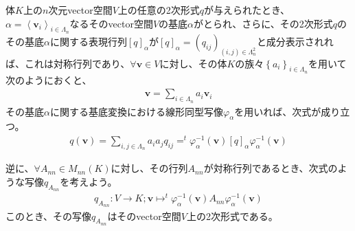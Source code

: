 \documentclass[dvipdfmx]{jsarticle}
\begin{document}
\begin{thm}\label{2.3.5.3}
体$K$上の$n$次元vector空間$V$上の任意の2次形式$q$が与えられたとき、$\alpha = \left\langle \mathbf{v}_{i} \right\rangle_{i \in \varLambda_{n}}$なるそのvector空間$V$の基底$\alpha$がとられ、さらに、その2次形式$q$のその基底$\alpha$に関する表現行列$[ q]_{\alpha}$が$[ q]_{\alpha} = \left( q_{ij} \right)_{(i,j) \in \varLambda_{n}^{2}}$と成分表示されれば、これは対称行列であり、$\forall\mathbf{v} \in V$に対し、その体$K$の族々$\left\{ a_{i} \right\}_{i \in \varLambda_{n}}$を用いて次のようにおくと、
\begin{align*}
\mathbf{v} = \sum_{i \in \varLambda_{n}} {a_{i}\mathbf{v}_{i}}
\end{align*}
その基底$\alpha$に関する基底変換における線形同型写像$\varphi_{\alpha}$を用いれば、次式が成り立つ。
\begin{align*}
q\left( \mathbf{v} \right) = \sum_{i,j \in \varLambda_{n}} {a_{i}a_{j}q_{ij}} =^{t}\varphi_{\alpha}^{- 1}\left( \mathbf{v} \right)[ q]_{\alpha}\varphi_{\alpha}^{- 1}\left( \mathbf{v} \right)
\end{align*}\par
逆に、$\forall A_{nn} \in M_{nn}(K)$に対し、その行列$A_{nn}$が対称行列であるとき、次式のような写像$q_{A_{nn}}$を考えよう。
\begin{align*}
q_{A_{nn}}:V \rightarrow K;\mathbf{v} \mapsto^{t}\varphi_{\alpha}^{- 1}\left( \mathbf{v} \right)A_{nn}\varphi_{\alpha}^{- 1}\left( \mathbf{v} \right)
\end{align*}
このとき、その写像$q_{A_{nn}}$はそのvector空間$V$上の2次形式である。
\end{thm}
\end{document}
